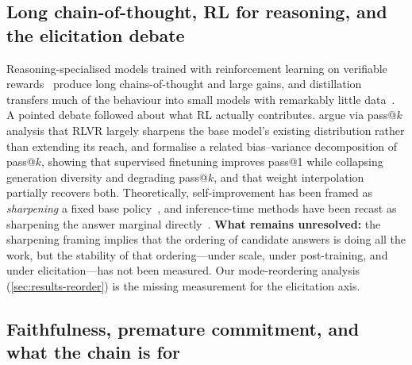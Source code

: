 \subsection{Long chain-of-thought, RL for reasoning, and the elicitation debate}

Reasoning-specialised models trained with reinforcement learning on verifiable
rewards~\citep{deepseekr1_2025,shao2024deepseekmath} produce long
chains-of-thought and large gains, and distillation transfers much of the
behaviour into small models with remarkably little
data~\citep{muennighoff2025s1,ye2025limo}. A pointed debate followed about what
RL actually contributes. \citet{yue2025rlvr} argue via pass@$k$ analysis that
RLVR largely sharpens the base model's existing distribution rather than
extending its reach, and \citet{diversitycollapse2025} formalise a related
bias--variance decomposition of pass@$k$, showing that supervised finetuning
improves pass@1 while collapsing generation diversity and degrading pass@$k$,
and that weight interpolation partially recovers both. Theoretically,
self-improvement has been framed as \emph{sharpening} a fixed base
policy~\citep{huang2025sharpening}, and inference-time methods have been
recast as sharpening the answer marginal
directly~\citep{marginalsharpening2026}. \textbf{What remains unresolved:} the
sharpening framing implies that the ordering of candidate answers is doing all
the work, but the stability of that ordering---under scale, under
post-training, and under elicitation---has not been measured. Our
mode-reordering analysis (\cref{sec:results-reorder}) is the missing
measurement for the elicitation axis.

\subsection{Faithfulness, premature commitment, and what the chain is for}

